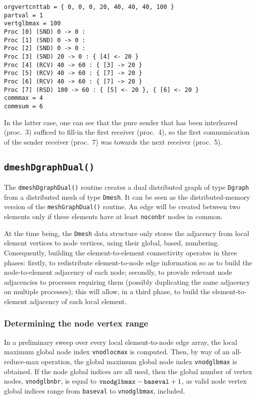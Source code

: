 \begin{lstlisting}
orgvertcnttab = { 0, 0, 0, 20, 40, 40, 40, 100 }
partval = 1
vertglbmax = 100
Proc [0] (SND) 0 -> 0 : 
Proc [1] (SND) 0 -> 0 : 
Proc [2] (SND) 0 -> 0 : 
Proc [3] (SND) 20 -> 0 : { [4] <- 20 }
Proc [4] (RCV) 40 -> 60 : { [3] -> 20 }
Proc [5] (RCV) 40 -> 60 : { [7] -> 20 }
Proc [6] (RCV) 40 -> 60 : { [7] -> 20 }
Proc [7] (RSD) 100 -> 60 : { [5] <- 20 }, { [6] <- 20 }
commmax = 4
commsum = 6
\end{lstlisting}
In the latter case, one can see that the pure sender that has been
interleaved (proc.~3) sufficed to fill-in the first receiver
(proc.~4), so the first communication of the sender receiver (proc.~7)
was towards the next receiver (proc.~5).

\subsection{\texttt{dmeshDgraphDual()}}

The \texttt{dmeshDgraphDual()} routine creates a dual distributed
graph of type \texttt{Dgraph} from a distributed mesh of type
\texttt{Dmesh}. It can be seen as the distributed-memory version of
the \texttt{meshGraphDual()} routine. An edge will be created between
two elements only if these elements have at least \texttt{noconbr}
nodes in common.

At the time being, the \texttt{Dmesh} data structure only stores the
adjacency from local element vertices to node vertices, using their
global, based, numbering. Consequently, building the
element-to-element connectivity operates in three phases:
firstly, to redistribute element-to-node edge information so as to
build the node-to-element adjacency of each node; secondly, to provide
relevant node adjacencies to processes requiring them (possibly
duplicating the same adjacency on multiple processes); this will
allow, in a third phase, to build the element-to-element adjacency of
each local element.

\subsubsection{Determining the node vertex range}

In a preliminary sweep over every local element-to-node edge array,
the local maximum global node index \texttt{vnodlocmax} is
computed. Then, by way of an all-reduce-max operation, the global
maximum global node index \texttt{vnodglbmax} is obtained. If the node
global indices are all used, then the global number of vertex nodes,
\texttt{vnodglbnbr}, is equal to $\mbox{\texttt{vnodglbmax}} -
\mbox{\texttt{baseval}} + 1$, as valid node vertex global indices
range from \texttt{baseval} to \texttt{vnodglbmax}, included.

